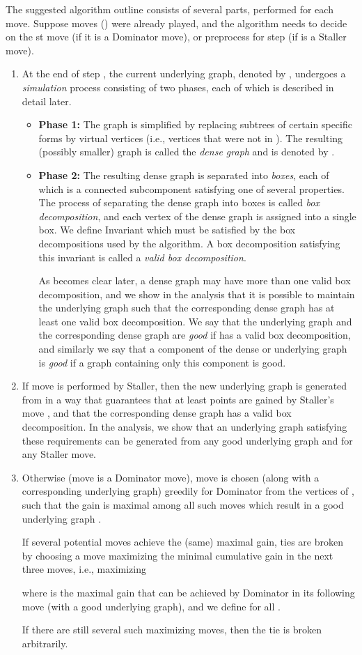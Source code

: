 \documentclass[11pt]{article}
\def\dnsitem{\vspace{-7pt}\item}
\def\dnssubitem{\vspace{-5pt}\item}
\theoremstyle{definition}
\begin{document}
The suggested algorithm outline consists of several parts, performed for each move.
Suppose  moves () were already played, and the algorithm needs to decide on the st move (if it is a Dominator move), or preprocess for step  (if  is a Staller move).
\begin{enumerate}
	\dnsitem At the end of step , the current underlying graph, denoted by , undergoes a \emph{simulation} process consisting of two phases, each of which is described in detail later.
	\begin{itemize}
		\dnsitem {\bf Phase 1:}
		The graph is simplified by replacing subtrees of certain specific forms by virtual vertices (i.e., vertices that were not in ).
		The resulting (possibly smaller) graph is called the \emph{dense graph} and is denoted by .

		\dnssubitem {\bf Phase 2:}
		The resulting dense graph  is separated into \emph{boxes}, each of which is a connected subcomponent satisfying one of several properties.
		The process of separating the dense graph into boxes is called \emph{box decomposition}, and each vertex of the dense graph is assigned into a single box.
		We define Invariant  which must be satisfied by the box decompositions used by the algorithm.
		A box decomposition satisfying this invariant is called a \emph{valid box decomposition}. 
		
		As becomes clear later, a dense graph may have more than one valid box decomposition, 
		and we show in the analysis that it is possible to maintain the underlying graph such that the corresponding dense graph has at least one valid box decomposition.
		We say that the underlying graph  and the corresponding dense graph  are \emph{good} if  has a valid box decomposition, 
		and similarly we say that a component  of the dense or underlying graph is \emph{good} if a graph containing only this component is good.
	\end{itemize}

	\dnsitem If move  is performed by Staller, then the new underlying graph  is generated from  in a way that guarantees that at least  points are gained 
	by Staller's move , 
	and that the corresponding dense graph has a valid box decomposition.
	In the analysis, we show that an underlying graph satisfying these requirements can be generated from any good underlying graph and for any Staller move.

	\dnsitem 
	\label{alg_outline:choose_dom}
	Otherwise (move  is a Dominator move),
	move  is chosen (along with a corresponding underlying graph) greedily for Dominator from the vertices of ,
	such that the gain is maximal among all such moves which result in a good underlying graph .
	
	If several potential moves achieve the (same) maximal gain, ties are broken by choosing a move maximizing the minimal cumulative gain in the next three moves, 
	i.e., maximizing 
	
	where  is the maximal gain that can be achieved by Dominator in its following move (with a good underlying graph), and we define  for all .
	
	If there are still several such maximizing moves, then the tie is broken arbitrarily.
\end{enumerate}
\end{document}
